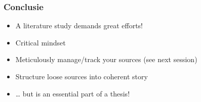 \documentclass[aspectratio=169]{beamer}
\begin{document}
    \begin{frame}
        \frametitle{Conclusie}
        
        \begin{itemize}
            \item A literature study demands great efforts!
            \item Critical mindset
            \item Meticulously manage/track your sources (see next session)
            \item Structure loose sources into coherent story
            \item \ldots{} but is an essential part of a thesis!
        \end{itemize}
        
    \end{frame}
    
\end{document}
